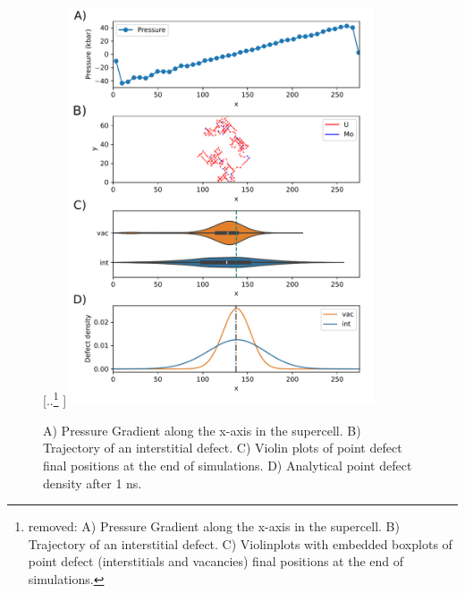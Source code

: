 \documentclass[review]{elsarticle}
\providecommand{\DIFadd}[1]{{\sf #1}} %
\providecommand{\DIFdel}[1]{{[..\footnote{removed: #1} ]}} %
\providecommand{\DIFaddbegin}{\protect\color{blue}} %
\providecommand{\DIFaddFL}[1]{\DIFadd{#1}} %
\providecommand{\DIFdelFL}[1]{\DIFdel{#1}} %
\providecommand{\DIFaddbeginFL}{} %
\providecommand{\DIFaddendFL}{} %
\providecommand{\DIFdelbeginFL}{} %
\providecommand{\DIFdelendFL}{} %
\newcommand{\DIFscaledelfig}{0.5}
\newlength{\DIFdelgraphicswidth} %
\newlength{\DIFdelgraphicsheight} %
\newcommand{\DIFaddincludegraphics}[2][]{{\color{blue}\fbox{\DIFOincludegraphics[#1]{#2}}}} %
\newcommand{\DIFdelincludegraphics}[2][]{%
\sbox{\DIFdelgraphicsbox}{\DIFOincludegraphics[#1]{#2}}%
\settoboxwidth{\DIFdelgraphicswidth}{\DIFdelgraphicsbox} %
\settoboxtotalheight{\DIFdelgraphicsheight}{\DIFdelgraphicsbox} %
\scalebox{\DIFscaledelfig}{%
\parbox[b]{\DIFdelgraphicswidth}{\usebox{\DIFdelgraphicsbox}\\[-\baselineskip] \rule{\DIFdelgraphicswidth}{0em}}\llap{\resizebox{\DIFdelgraphicswidth}{\DIFdelgraphicsheight}{%
\setlength{\unitlength}{\DIFdelgraphicswidth}%
\begin{picture}(1,1)%
\thicklines\linethickness{2pt} %
{\color[rgb]{1,0,0}\put(0,0){\framebox(1,1){}}}%
{\color[rgb]{1,0,0}\put(0,0){\line( 1,1){1}}}%
{\color[rgb]{1,0,0}\put(0,1){\line(1,-1){1}}}%
\end{picture}%
}\hspace*{3pt}}} %
} %
\DeclareRobustCommand{\DIFaddbegin}{\DIFOaddbegin \let\includegraphics\DIFaddincludegraphics} %
\DeclareRobustCommand{\DIFaddbeginFL}{\DIFOaddbeginFL \let\includegraphics\DIFaddincludegraphics} %
\DeclareRobustCommand{\DIFaddendFL}{\DIFOaddendFL \let\includegraphics\DIFOincludegraphics} %
\DeclareRobustCommand{\DIFdelbeginFL}{\DIFOdelbeginFL \let\includegraphics\DIFdelincludegraphics} %
\DeclareRobustCommand{\DIFdelendFL}{\DIFOaddendFL \let\includegraphics\DIFOincludegraphics} %
\begin{document}
\begin{figure}[h!]
\centering
\DIFdelbeginFL %
{%
\DIFdelFL{A) Pressure Gradient along the x-axis in the supercell. B) Trajectory of an interstitial defect. C) Violinplots with embedded boxplots of point defect (interstitials and vacancies) final positions at the end of simulations.}}
\DIFdelendFL \DIFaddbeginFL \includegraphics[width=0.8\textwidth]{PrGrad.pdf}
\caption{\DIFaddFL{A) Pressure Gradient along the x-axis in the supercell. B) Trajectory of an interstitial defect. C) Violin plots of point defect final positions at the end of simulations. D) Analytical point defect density after 1 ns.}}
\DIFaddendFL \label{fig:diff}
\end{figure}

\DIFaddbegin 
\end{document}
